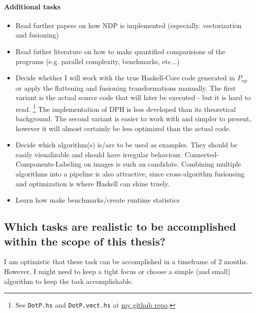 \documentclass{article}
\newcommand{\ndp}[0]{$P_{np}$}
\begin{document}
    \paragraph{Additional tasks}
        \begin{itemize}
            \item Read further papers on how NDP is implemented (especially. vectorization and fusioning)
            \item Read futher literature on how to make quantified comparisions of the programs (e.g. parallel complexity, benchmarks, etc...)
            \item Decide whether I will work with the true Haskell-Core code generated in \ndp or apply the flattening and fusioning transformations manually.
                The first variant is the actual source code that will later be executed - but it is hard to read. \footnote[1]{See \texttt{DotP.hs} and \texttt{DotP.vect.hs} at \href{https://github.com/GollyTicker/Nested-Data-Parallel-Haskell/tree/0e8d3df0d8084a01b007b27debda2b64247a254d}{my github repo}. }
                The implementation of DPH is less developed than its theoretical background.
                The second variant is easier to work with and simpler to present, however it will almost certainly be less optimized than the actual code.
            \item Decide which algorithm(s) is/are to be used as examples. They should be easily visualizable and should have irregular behaviour.
                Connected-Components-Labeling on images is such an candidate. Combining multiple algorithms into
                a pipeline is also attractive, since cross-algorithm fusionsing and optimization is where Haskell can shine truely.
            \item Learn how make benchmarks/create runtime statistics
        \end{itemize}
        
    \subsection{Which tasks are realistic to be accomplished within the scope of this thesis?}
    I am optimistic that these task can be accomplished in a timeframe of 2 months. However, I might need to keep a tight focus or
    choose a simple (and small) algorithm to keep the task accomplishable.
    
\end{document}

